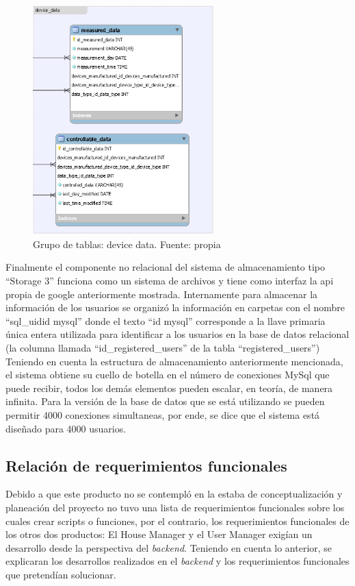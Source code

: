 \begin{itemize}
	\begin{figure}[htbp]
		\centerline{\includegraphics[width=7cm]{figuras/device_data.png}}
		\caption{Grupo de tablas: device data. Fuente: propia}
		\label{fig_27}
	\end{figure}
	
\end{itemize}

Finalmente el componente no relacional del sistema de almacenamiento tipo ``Storage 3'' funciona como un sistema de archivos y tiene como interfaz la api propia de google anteriormente mostrada. Internamente para almacenar la información de los usuarios se organizó la información en carpetas con el nombre ``sql\_uid{id mysql}'' donde el texto ``{id mysql}'' corresponde a la llave primaria única entera utilizada para identificar a los usuarios en la base de datos relacional (la columna llamada ``id\_registered\_users'' de la tabla ``registered\_users'')
\vspace{0.5cm}\\
Teniendo en cuenta la estructura de almacenamiento anteriormente mencionada, el sistema obtiene su cuello de botella en el número de conexiones MySql que puede recibir, todos los demás elementos pueden escalar, en teoría, de manera infinita. Para la versión de la base de datos que se está utilizando se pueden permitir 4000 conexiones simultaneas, por ende, se dice que el sistema está diseñado para 4000 usuarios.

\subsection{Relación de requerimientos funcionales}

Debido a que este producto no se contempló en la estaba de conceptualización y planeación del proyecto no tuvo una lista de requerimientos funcionales sobre los cuales crear scripts o funciones, por el contrario, los requerimientos funcionales de los otros dos productos: El House Manager y el User Manager exigían un desarrollo desde la perspectiva del \textit{backend}. Teniendo en cuenta lo anterior, se explicaran los desarrollos realizados en el \textit{backend} y los requerimientos funcionales que pretendían solucionar.

